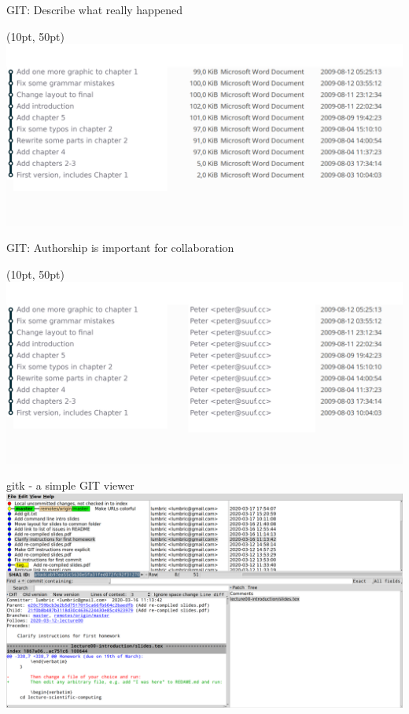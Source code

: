 \begin{frame}[fragile]{GIT: Describe what really happened}
    \begin{textblock*}{\textwidth}(10pt, 50pt)
        \includegraphics[width=\textwidth]{images/screenshot-ugly-filenames-3.png}
    \end{textblock*}
\end{frame}


\begin{frame}[fragile]{GIT: Authorship is important for collaboration}
    \begin{textblock*}{\textwidth}(10pt, 50pt)
        \includegraphics[width=\textwidth]{images/screenshot-ugly-filenames-4.png}
    \end{textblock*}
\end{frame}


\begin{frame}[fragile]{gitk - a simple GIT viewer}
    \includegraphics[width=\textwidth]{images/gitk-screenshot.png}
\end{frame}


